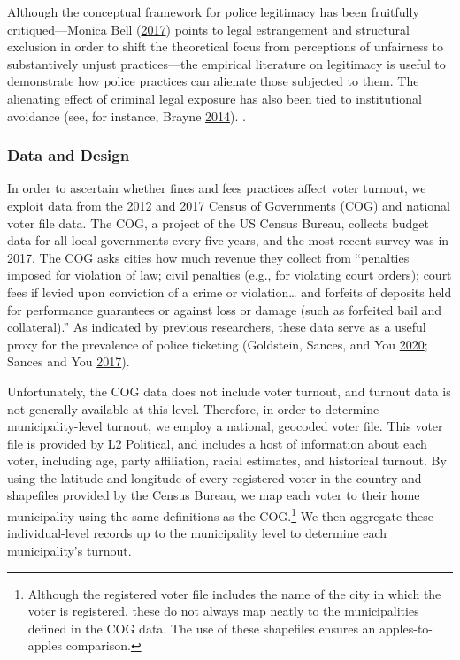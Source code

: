 \documentclass[
  12pt,
]{article}
\begin{document}
Although the conceptual framework for police legitimacy has been fruitfully critiqued---Monica Bell (\protect\hyperlink{ref-Bell2017}{2017}) points to legal estrangement and structural exclusion in order to shift the theoretical focus from perceptions of unfairness to substantively unjust practices---the empirical literature on legitimacy is useful to demonstrate how police practices can alienate those subjected to them. The alienating effect of criminal legal exposure has also been tied to institutional avoidance (see, for instance, Brayne \protect\hyperlink{ref-Brayne2014}{2014}). .

\hypertarget{data-and-design}{%
\subsubsection*{Data and Design}\label{data-and-design}}

In order to ascertain whether fines and fees practices affect voter turnout, we exploit data from the 2012 and 2017 Census of Governments (COG) and national voter file data. The COG, a project of the US Census Bureau, collects budget data for all local governments every five years, and the most recent survey was in 2017. The COG asks cities how much revenue they collect from ``penalties imposed for violation of law; civil penalties (e.g., for violating court orders); court fees if levied upon conviction of a crime or violation\ldots{} and forfeits of deposits held for performance guarantees or against loss or damage (such as forfeited bail and collateral).'' As indicated by previous researchers, these data serve as a useful proxy for the prevalence of police ticketing (Goldstein, Sances, and You \protect\hyperlink{ref-Goldstein2020}{2020}; Sances and You \protect\hyperlink{ref-Sances2017}{2017}).

Unfortunately, the COG data does not include voter turnout, and turnout data is not generally available at this level. Therefore, in order to determine municipality-level turnout, we employ a national, geocoded voter file. This voter file is provided by L2 Political, and includes a host of information about each voter, including age, party affiliation, racial estimates, and historical turnout. By using the latitude and longitude of every registered voter in the country and shapefiles provided by the Census Bureau, we map each voter to their home municipality using the same definitions as the COG.\footnote{Although the registered voter file includes the name of the city in which the voter is registered, these do not always map neatly to the municipalities defined in the COG data. The use of these shapefiles ensures an apples-to-apples comparison.} We then aggregate these individual-level records up to the municipality level to determine each municipality's turnout.
\end{document}
